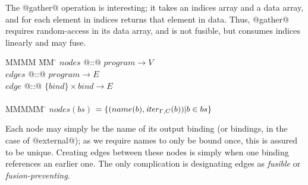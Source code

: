 The @gather@ operation is interesting; it takes an indices array and a data array, and for each element in indices returns that element in data.
Thus, @gather@ requires random-access in its data array, and is not fusible, but consumes indices linearly and may fuse.

\begin{tabbing}
MMMM        \= MM   \= \kill
$nodes$     \> @::@ \> $program \to V$          \\
$edges$     \> @::@ \> $program \to E$          \\
$edge$      \> @::@ \> $\{bind\} \times bind \to E$\\
\\
MMMMM       \= \kill
$nodes(bs)$ \> $= \{(name(b), \mathit{iter}_{\Gamma,C}(b)) | b \in bs\}$       \\
\end{tabbing}
Each node may simply be the name of its output binding (or bindings, in the case of @external@); as we require names to only be bound once, this is assured to be unique.
Creating edges between these nodes is simply when one binding references an earlier one. The only complication is designating edges as \emph{fusible} or \emph{fusion-preventing}.

